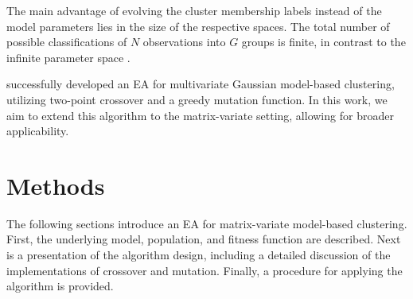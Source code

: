 \documentclass[12pt]{report}
\begin{document}
The main advantage of evolving the cluster membership labels instead of the model parameters lies in the size of the respective spaces. The total number of possible classifications of $N$ observations into $G$ groups is finite, in contrast to the infinite parameter space \citep{andrews2013}.

\citet{mcnicholas2020} successfully developed an EA for multivariate Gaussian model-based clustering, utilizing two-point crossover and a greedy mutation function. In this work, we aim to extend this algorithm to the matrix-variate setting, allowing for broader applicability.






\chapter{Methods}
The following sections introduce an EA for matrix-variate model-based clustering. First, the underlying model, population, and fitness function are described. Next is a presentation of the algorithm design, including a detailed discussion of the implementations of crossover and mutation. Finally, a procedure for applying the algorithm is provided.




\end{document}
